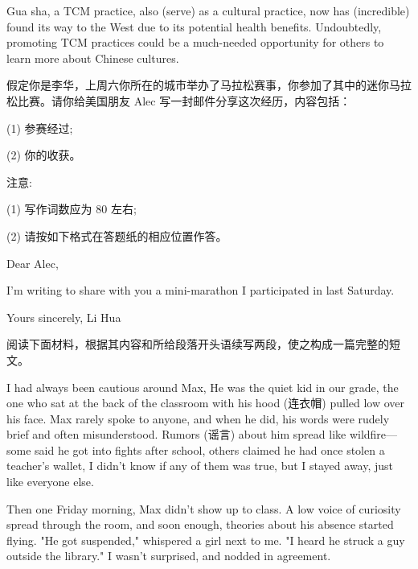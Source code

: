 \documentclass{英语试卷}
\begin{document}
\par Gua sha, a TCM practice, also  (serve) as a cultural practice, now has  (incredible) found its way to the West due to its potential health benefits. Undoubtedly, promoting TCM practices could be a much-needed opportunity for others to learn more about Chinese cultures.\par
{}
\par 假定你是李华，上周六你所在的城市举办了马拉松赛事，你参加了其中的迷你马拉松比赛。请你给美国朋友 Alec 写一封邮件分享这次经历，内容包括：\par
\par (1) 参赛经过;\par
\par (2) 你的收获。\par
\par 注意:\par
\par (1) 写作词数应为 80 左右;\par
\par (2) 请按如下格式在答题纸的相应位置作答。\par
\par Dear Alec,\par
\par I'm writing to share with you a mini-marathon I participated in last Saturday.\par
\par Yours sincerely, Li Hua\par
{}
\par 阅读下面材料，根据其内容和所给段落开头语续写两段，使之构成一篇完整的短文。\par
\par I had always been cautious around Max, He was the quiet kid in our grade, the one who sat at the back of the classroom with his hood (连衣帽) pulled low over his face. Max rarely spoke to anyone, and when he did, his words were rudely brief and often misunderstood. Rumors (谣言) about him spread like wildfire—some said he got into fights after school, others claimed he had once stolen a teacher's wallet, I didn't know if any of them was true, but I stayed away, just like everyone else.\par
\par Then one Friday morning, Max didn't show up to class. A low voice of curiosity spread through the room, and soon enough, theories about his absence started flying. "He got suspended," whispered a girl next to me. "I heard he struck a guy outside the library." I wasn't surprised, and nodded in agreement.\par
\end{document}
